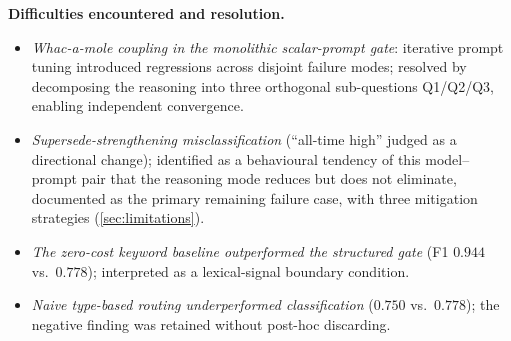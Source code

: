 \documentclass{article}
\theoremstyle{definition}
\begin{document}
\noindent\textbf{Difficulties encountered and resolution.}
\begin{itemize}
  \item \textit{Whac-a-mole coupling in the monolithic scalar-prompt
    gate}: iterative prompt tuning introduced regressions across disjoint
    failure modes; resolved by decomposing the reasoning into three
    orthogonal sub-questions Q1/Q2/Q3, enabling independent convergence.
  \item \textit{Supersede-strengthening misclassification} (``all-time
    high'' judged as a directional change); identified as a behavioural
    tendency of this model--prompt pair that the reasoning mode reduces
    but does not eliminate, documented as the primary remaining failure
    case, with three mitigation strategies (\cref{sec:limitations}).
  \item \textit{The zero-cost keyword baseline outperformed the structured
    gate} (F1 $0.944$ vs.\ $0.778$); interpreted as a lexical-signal
    boundary condition.
  \item \textit{Naive type-based routing underperformed classification}
    ($0.750$ vs.\ $0.778$); the negative finding was retained without
    post-hoc discarding.
\end{itemize}
\end{document}
